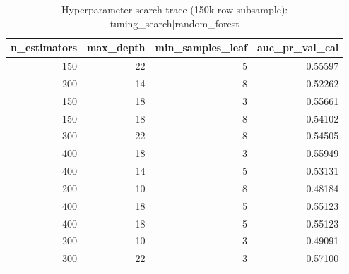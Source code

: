 \begin{table}
\caption{Hyperparameter search trace (150k-row subsample): tuning_search|random_forest}
\label{tab:table14_hp_search_random_forest}
\begin{tabular}{rrrr}
\toprule
n\_estimators & max\_depth & min\_samples\_leaf & auc\_pr\_val\_cal \\
\midrule
150 & 22 & 5 & 0.55597 \\
200 & 14 & 8 & 0.52262 \\
150 & 18 & 3 & 0.55661 \\
150 & 18 & 8 & 0.54102 \\
300 & 22 & 8 & 0.54505 \\
400 & 18 & 3 & 0.55949 \\
400 & 14 & 5 & 0.53131 \\
200 & 10 & 8 & 0.48184 \\
400 & 18 & 5 & 0.55123 \\
400 & 18 & 5 & 0.55123 \\
200 & 10 & 3 & 0.49091 \\
300 & 22 & 3 & 0.57100 \\
\bottomrule
\end{tabular}
\end{table}

